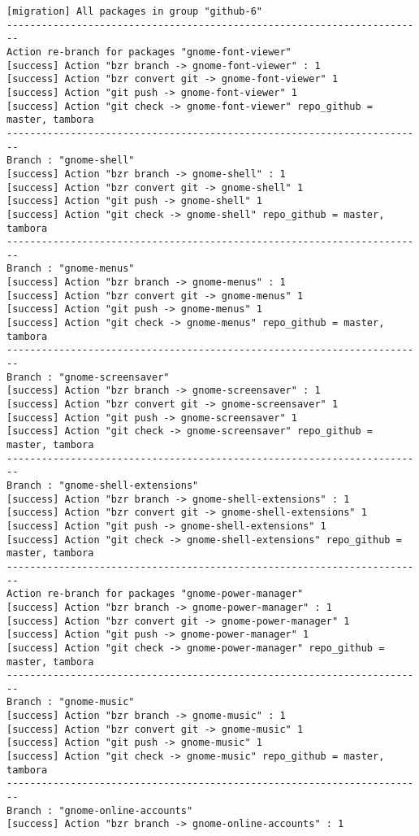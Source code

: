 {\begin{lstlisting}[language=ShellBash2]
[migration] All packages in group "github-6" 
------------------------------------------------------------------------
Action re-branch for packages "gnome-font-viewer" 
[success] Action "bzr branch -> gnome-font-viewer" : 1
[success] Action "bzr convert git -> gnome-font-viewer" 1
[success] Action "git push -> gnome-font-viewer" 1
[success] Action "git check -> gnome-font-viewer" repo_github = master, tambora
------------------------------------------------------------------------
Branch : "gnome-shell"
[success] Action "bzr branch -> gnome-shell" : 1
[success] Action "bzr convert git -> gnome-shell" 1
[success] Action "git push -> gnome-shell" 1
[success] Action "git check -> gnome-shell" repo_github = master, tambora
------------------------------------------------------------------------
Branch : "gnome-menus"
[success] Action "bzr branch -> gnome-menus" : 1
[success] Action "bzr convert git -> gnome-menus" 1
[success] Action "git push -> gnome-menus" 1
[success] Action "git check -> gnome-menus" repo_github = master, tambora
------------------------------------------------------------------------
Branch : "gnome-screensaver"
[success] Action "bzr branch -> gnome-screensaver" : 1
[success] Action "bzr convert git -> gnome-screensaver" 1
[success] Action "git push -> gnome-screensaver" 1
[success] Action "git check -> gnome-screensaver" repo_github = master, tambora
------------------------------------------------------------------------
Branch : "gnome-shell-extensions"
[success] Action "bzr branch -> gnome-shell-extensions" : 1
[success] Action "bzr convert git -> gnome-shell-extensions" 1
[success] Action "git push -> gnome-shell-extensions" 1
[success] Action "git check -> gnome-shell-extensions" repo_github = master, tambora
------------------------------------------------------------------------
Action re-branch for packages "gnome-power-manager" 
[success] Action "bzr branch -> gnome-power-manager" : 1
[success] Action "bzr convert git -> gnome-power-manager" 1
[success] Action "git push -> gnome-power-manager" 1
[success] Action "git check -> gnome-power-manager" repo_github = master, tambora
------------------------------------------------------------------------
Branch : "gnome-music"
[success] Action "bzr branch -> gnome-music" : 1
[success] Action "bzr convert git -> gnome-music" 1
[success] Action "git push -> gnome-music" 1
[success] Action "git check -> gnome-music" repo_github = master, tambora
------------------------------------------------------------------------
Branch : "gnome-online-accounts"
[success] Action "bzr branch -> gnome-online-accounts" : 1

\end{lstlisting}}
